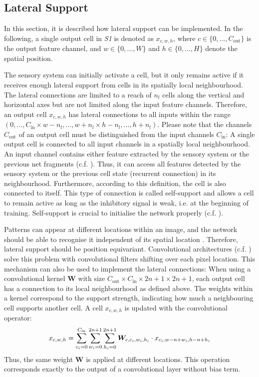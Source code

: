 \subsection{Lateral Support}
In this section, it is described how lateral support can be implemented.
In the following, a single output cell in \emph{S1} is denoted as $x_{c,w,h}$, where $c \in \{0, ..., C_{\text{out}}\}$ is the output feature channel, and $w \in \{0, ..., W\}$ and $h \in \{0, ..., H\}$ denote the spatial position.

The sensory system can initially activate a cell, but it only remains active if it receives enough lateral support from cells in its spatially local neighbourhood.
The lateral connections are limited to a reach of $n_{l}$ cells along the vertical and horizontal axes but are not limited along the input feature channels.
Therefore, an output cell $x_{c,w,h}$ has lateral connections to all inputs within the range $(0, ..., C_{\text{in}} \times w - n_l, ..., w+n_l \times h - n_l, ..., h+n_l)$.
Please note that the channels $C_{\text{out}}$ of an output cell must be distinguished from the input channels $C_{\text{in}}$: A single output cell is connected to all input channels in a spatially local neighbourhood. An input channel contains either feature extracted by the sensory system or the previous net fragments (c.f. ). Thus, it can access all features detected by the sensory system or the previous cell state (recurrent connection) in its neighbourhood.
Furthermore, according to this definition, the cell is also connected to itself.
This type of connection is called self-support and allows a cell to remain active as long as the inhibitory signal is weak, i.e. at the beginning of training.
Self-support is crucial to initialise the network properly (c.f. ).

Patterns can appear at different locations within an image, and the network should be able to recognise it independent of its spatial location . 
Therefore, lateral support should be position equivariant.
Convolutional architectures (c.f. ) solve this problem with convolutional filters shifting over each pixel location. This mechanism can also be used to implement the lateral connections: When using a convolutional kernel $\boldsymbol{W}$ with size $C_{\text{out}} \times C_{\text{in}} \times 2n+1 \times 2n+1$, each output cell has a connection to its local neighbourhood as defined above.
The weights within a kernel correspond to the support strength, indicating how much a neighbouring cell supports another cell. A cell $x_{c,w,h}$ is updated with the convolutional operator: 
%
\begin{align}\eqlbl{convlat_1}
	x_{c,w,h} = \sum_{c_i=0}^{C_{\text{in}}} \sum_{w_i=0}^{2n+1} \sum_{h_i=0}^{2n+1} \boldsymbol{W}_{c, c_i,w_i,h_i} \cdot x_{c_i,w-n+w_i,h-n+h_i}
\end{align}
%
Thus, the same weight $\boldsymbol{W}$ is applied at different locations.
This operation corresponds exactly to the output of a convolutional layer without bias term.


